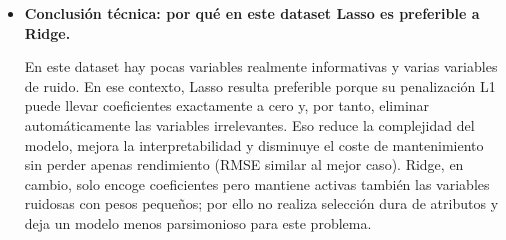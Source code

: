 \documentclass[12pt,oneside]{book}
\begin{document}
\begin{itemize}
    \item \textbf{Conclusión técnica: por qué en este dataset Lasso es preferible a Ridge.}

    En este dataset hay pocas variables realmente informativas y varias variables de ruido. En ese contexto, Lasso resulta preferible porque su penalización L1 puede llevar coeficientes exactamente a cero y, por tanto, eliminar automáticamente las variables irrelevantes. Eso reduce la complejidad del modelo, mejora la interpretabilidad y disminuye el coste de mantenimiento sin perder apenas rendimiento (RMSE similar al mejor caso). Ridge, en cambio, solo encoge coeficientes pero mantiene activas también las variables ruidosas con pesos pequeños; por ello no realiza selección dura de atributos y deja un modelo menos parsimonioso para este problema.
    
\end{itemize}

\vspace{3.0cm}
\end{document}

